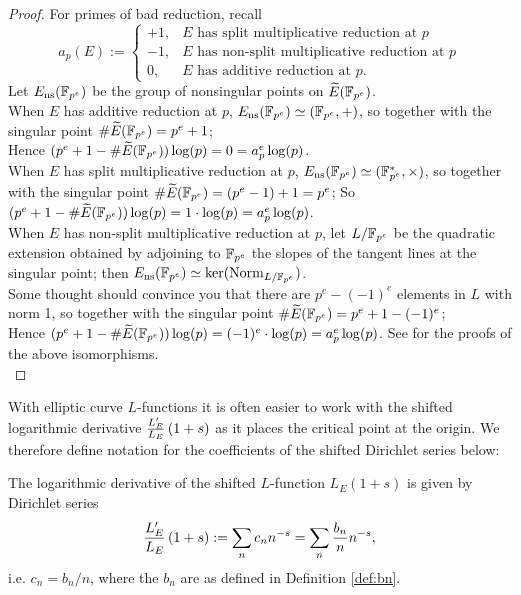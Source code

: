 \begin{proof}
For primes of bad reduction, recall
\begin{equation}
a_p(E) := \begin{cases}
+1, & \text{$E$ has split multiplicative reduction at $p$} \\
-1, & \text{$E$ has non-split multiplicative reduction at $p$} \\
0, & \text{$E$ has additive reduction at $p$.}
\end{cases}
\end{equation}
Let $E_{\text{ns}}(\mathbb{F}_{p^e})$ be the group of nonsingular points on $\widetilde{E}(\mathbb{F}_{p^e})$. \\
When $E$ has additive reduction at $p$, $E_{\text{ns}}(\mathbb{F}_{p^e}) \simeq (\mathbb{F}_{p^e},+)$, so together with the singular point $\#\widetilde{E}(\mathbb{F}_{p^e}) = p^e+1$; \\
Hence $(p^e + 1 - \#\widetilde{E}(\mathbb{F}_{p^e}))\log(p) = 0 = a_p^e \log(p)$. \\
When $E$ has split multiplicative reduction at $p$, $E_{\text{ns}}(\mathbb{F}_{p^e}) \simeq (\mathbb{F}_{p^e}^*,\times)$, so together with the singular point $\#\widetilde{E}(\mathbb{F}_{p^e}) = (p^e-1)+1 = p^e$; So $(p^e + 1 - \#\widetilde{E}(\mathbb{F}_{p^e}))\log(p) = 1\cdot \log(p) = a_p^e \log(p)$. \\
When $E$ has non-split multiplicative reduction at $p$, let $L/\mathbb{F}_{p^e}$ be the quadratic extension obtained by adjoining to $\mathbb{F}_{p^e}$ the slopes of the tangent lines  at the singular point; then $E_{\text{ns}}(\mathbb{F}_{p^e}) \simeq \ker(\operatorname{Norm}_{L/\mathbb{F}_{p^e}})$. \\
Some thought should convince you that there are $p^e-(-1)^e$ elements in $L$ with norm 1, so together with the singular point $\#\widetilde{E}(\mathbb{F}_{p^e}) = p^e+1-(-1)^e$; \\
Hence $(p^e + 1 - \#\widetilde{E}(\mathbb{F}_{p^e}))\log(p) = (-1)^e\cdot \log(p) = a_p^e \log(p)$.
See \cite[pg. 180, Prop. 5.1]{Sil-1985} for the proofs of the above isomorphisms.\\
\end{proof}

With elliptic curve $L$-functions it is often easier to work with the shifted logarithmic derivative $\frac{L_E^{\prime}}{L_E}\left(1+s\right)$ as it places the critical point at the origin. We therefore define notation for the coefficients of the shifted Dirichlet series below:
\begin{definition}\label{def:cn}
The logarithmic derivative of the shifted $L$-function $L_E(1+s)$ is given by Dirichlet series
\begin{equation}
\frac{L_E^{\prime}}{L_E}\left(1+s\right) := \sum_n c_n n^{-s} = \sum_{n} \frac{b_n}{n} n^{-s},
\end{equation}
i.e. $c_n = b_n/n$, where the $b_n$ are as defined in Definition \ref{def:bn}.
\end{definition}

